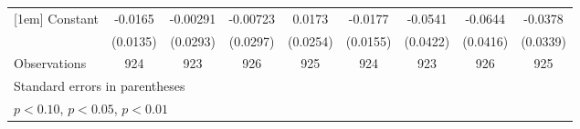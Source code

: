 {\begin{tabular}{l*{8}{c}}
[1em]
Constant            &     -0.0165         &    -0.00291         &    -0.00723         &      0.0173         &     -0.0177         &     -0.0541         &     -0.0644         &     -0.0378         \\
                    &    (0.0135)         &    (0.0293)         &    (0.0297)         &    (0.0254)         &    (0.0155)         &    (0.0422)         &    (0.0416)         &    (0.0339)         \\
\hline
Observations        &         924         &         923         &         926         &         925         &         924         &         923         &         926         &         925         \\
\hline\hline
\multicolumn{9}{l}{\footnotesize Standard errors in parentheses}\\
\multicolumn{9}{l}{\footnotesize \sym{*} \(p<0.10\), \sym{**} \(p<0.05\), \sym{***} \(p<0.01\)}\\
\end{tabular}
}
